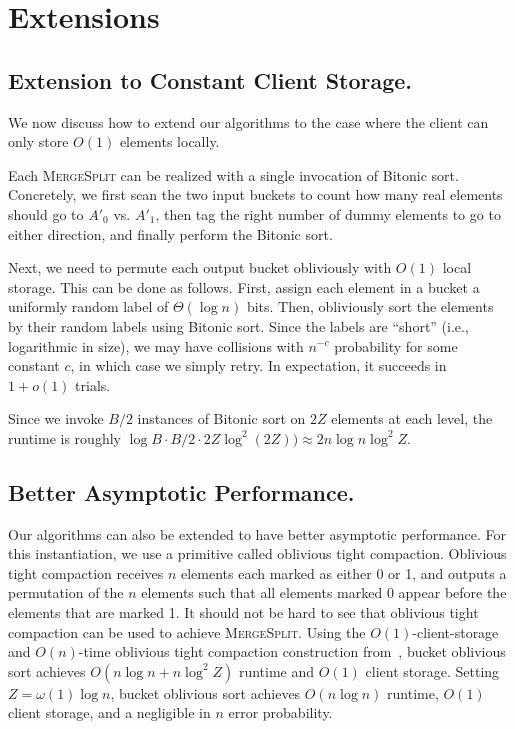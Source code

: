\section{Extensions}
\label{sec:extensions}

\subsection{Extension to Constant Client Storage.}
\label{sec:O1client}
We now discuss how to extend our algorithms to the case where the client can only store $O(1)$ elements locally.

Each \textsc{MergeSplit} can be realized with a single invocation of Bitonic sort.
Concretely, we first scan the two input buckets to count how many real elements should go to $A'_0$ vs. $A'_1$, then tag the right number of dummy elements to go to either direction, and finally perform the Bitonic sort.

Next, we need to permute each output bucket obliviously with $O(1)$ local storage. 
This can be done as follows. 
First, assign each element in a bucket a uniformly random label of $\Theta(\log n)$ bits. 
Then, obliviously sort the elements by their random labels using Bitonic sort. 
Since the labels are ``short'' (i.e., logarithmic in size), we may have collisions with $n^{-c}$ probability for some constant $c$, in which case we simply retry. 
In expectation, it succeeds in $1+o(1)$ trials. 


Since we invoke $B/2$ instances of Bitonic sort on $2Z$ elements at each level,
the runtime is roughly $\log B \cdot B/2 \cdot 2Z \log^2 (2Z)) \approx 2 n\log n \log^2 Z$. 

\subsection{Better Asymptotic Performance.}
Our algorithms can also be extended to have better asymptotic performance.
For this instantiation, we use a primitive called oblivious tight compaction.
Oblivious tight compaction receives $n$ elements each marked as either 0 or 1, and outputs a permutation of the $n$ elements such that all elements marked 0 appear before the elements that are marked 1. 
It should not be hard to see that oblivious tight compaction can be used to achieve \textsc{MergeSplit}.
Using the $O(1)$-client-storage and $O(n)$-time oblivious tight compaction construction from~\cite{asharov2018optorama}, bucket oblivious sort achieves $O(n\log n + n\log^2Z)$ runtime and $O(1)$ client storage.
Setting $Z=\omega(1)\log n$, bucket oblivious sort achieves $O(n\log n)$ runtime, $O(1)$ client storage, and a negligible in $n$ error probability.

